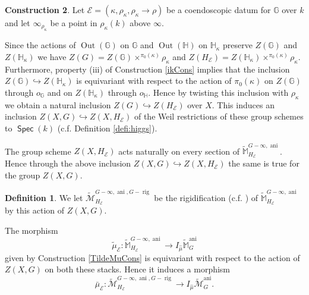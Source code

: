 \documentclass{article}
\DeclareMathOperator{\rig}{rig}
\DeclareMathOperator{\ani}{ani}
\DeclareMathOperator{\Spec}{\mathsf{Spec}}
\newcommand{\BG}{{\mathbb{G}}}
\newcommand{\BH}{{\mathbb{H}}}
\newcommand{\BM}{{\mathbb{M}}}
\newcommand{\CE}{{\mathcal E}}
\DeclareMathOperator{\Out}{Out}
\let\into\hookrightarrow
\theoremstyle{definition}
\newtheorem{definition}{Definition}[section]
\newtheorem{construction}[definition]{Construction}
\theoremstyle{plain}
\begin{document}
\begin{construction}\label{grig}
   Let $\CE=(\kappa,\rho_\kappa,\rho_\kappa \to \rho)$ be a coendoscopic datum for $\BG$ over $k$ and let $\infty_{\rho_\kappa}$ be a point in $\rho_\kappa(k)$ above $\infty$. 

Since the actions of $\Out(\BG)$ on $\BG$ and $\Out(\BH)$ on $\BH_\kappa$ preserve $Z(\BG)$ and $Z(\BH_\kappa)$ we have $Z(G)=Z(\BG) \times^{\pi_0(\kappa)} \rho_\kappa$ and $Z(H_\CE)=Z(\BH_\kappa)\times ^{\pi_0(\kappa)} \rho_\kappa$. Furthermore, property (iii) of Construction \ref{ikCons} implies that the inclusion $Z(\BG) \into Z(\BH_\kappa)$ is equivariant with respect to the action of $\pi_0(\kappa)$ on $Z(\BG)$ through $o_\BG$ and on $Z(\BH_\kappa)$ through $o_{\BH}$. Hence by twisting this inclusion with $\rho_\kappa$ we obtain a natural inclusion $Z(G) \into Z(H_\CE)$ over $X$. This induces an inclusion $Z(X,G) \into Z(X,H_\CE)$ of the Weil restrictions of these group schemes to $\Spec(k)$ (c.f. Definition \ref{defi:higgs}).

The group scheme $Z(X,H_\CE)$ acts naturally on every section of $\widetilde{\BM}^{G-\infty,\ani}_{H_\CE}$. Hence through the above inclusion $Z(X,G) \into Z(X,H_\CE)$ the same is true for the group $Z(X,G)$. 
\begin{definition}\label{defi:Grig}
We let $\widetilde{\mathcal{M}}^{G-\infty,\ani,G-\rig}_{H_\CE}$ be the rigidification (c.f. \cite[Theorem 5.1.5]{abramovich2003twisted}) of $\widetilde{\BM}^{G-\infty,\ani}_{H_\CE}$ by this action of $Z(X,G)$.
\end{definition}

The morphism $$\tilde\mu_\CE\colon \widetilde{\BM}^{G-\infty,\ani}_{H_\CE} \to I_{\hat\mu} \widetilde{\BM}^{\ani}_G$$ given by Construction \ref{TildeMuCons} is equivariant with respect to the action of $Z(X,G)$ on both these stacks. Hence it induces a morphism
\begin{equation*}
  \bar\mu_\CE\colon \widetilde{\mathcal{M}}^{G-\infty,\ani,G-\rig}_{H_\CE} \to I_{\hat\mu} \widetilde{\mathcal{M}}^{\ani}_G.
\end{equation*}
\end{construction}
\end{document}
